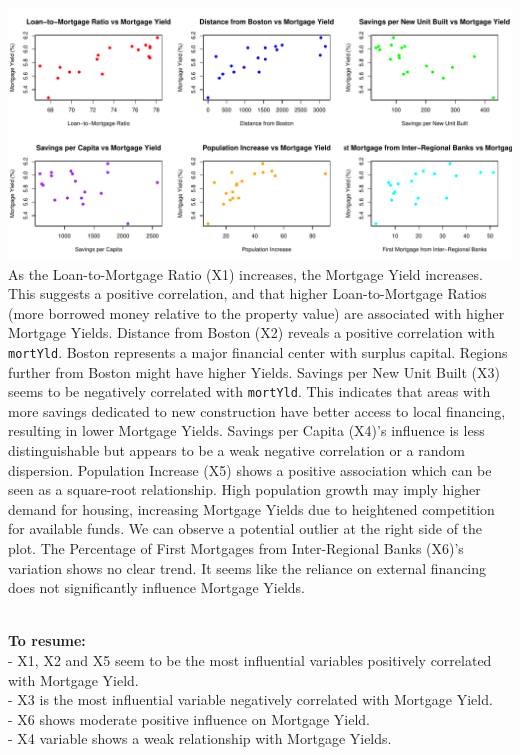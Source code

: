 \documentclass[
  11pt,
]{article}
\begin{document}
\includegraphics{Figs/unnamed-chunk-6-1.pdf}\\
As the Loan-to-Mortgage Ratio (X1) increases, the Mortgage Yield
increases. This suggests a positive correlation, and that higher
Loan-to-Mortgage Ratios (more borrowed money relative to the property
value) are associated with higher Mortgage Yields. Distance from Boston
(X2) reveals a positive correlation with \texttt{mortYld}. Boston
represents a major financial center with surplus capital. Regions
further from Boston might have higher Yields. Savings per New Unit Built
(X3) seems to be negatively correlated with \texttt{mortYld}. This
indicates that areas with more savings dedicated to new construction
have better access to local financing, resulting in lower Mortgage
Yields. Savings per Capita (X4)'s influence is less distinguishable but
appears to be a weak negative correlation or a random dispersion.
Population Increase (X5) shows a positive association which can be seen
as a square-root relationship. High population growth may imply higher
demand for housing, increasing Mortgage Yields due to heightened
competition for available funds. We can observe a potential outlier at
the right side of the plot. The Percentage of First Mortgages from
Inter-Regional Banks (X6)'s variation shows no clear trend. It seems
like the reliance on external financing does not significantly influence
Mortgage Yields.\\
\strut \\
\textbf{To resume:}\\
- X1, X2 and X5 seem to be the most influential variables positively
correlated with Mortgage Yield.\\
- X3 is the most influential variable negatively correlated with
Mortgage Yield.\\
- X6 shows moderate positive influence on Mortgage Yield.\\
- X4 variable shows a weak relationship with Mortgage Yields.\\
\end{document}
